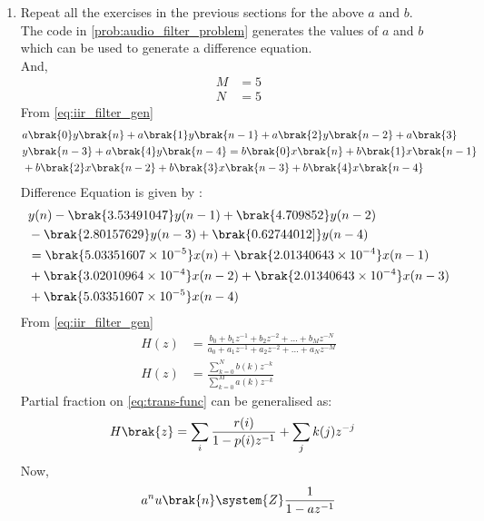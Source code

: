 \documentclass[journal,12pt,twocolumn]{IEEEtran}
\theoremstyle{remark}
\begin{document}
\begin{enumerate}[label=\thesection.\arabic*]
			\item Repeat all the exercises in the previous sections for the above $a$ and $b$.\\
				\solution The code in \ref{prob:audio_filter_problem} generates the values of $a$ and $b$  which can be used to generate a difference equation.\\
				And,
				\begin{align}
					    M &= 5\\
					        N&=5
				\end{align}
				From \ref{eq:iir_filter_gen} 
				\begin{align}
					    &a\brak{0}y\brak{n} + a\brak{1}y\brak{n-1}+a\brak{2}y\brak{n-2}+a\brak{3}\\ \notag &y\brak{n-3} + a\brak{4}y\brak{n-4} =   b\brak{0}x\brak{n} + b\brak{1}x\brak{n-1}\\ \notag &+b\brak{2}x\brak{n-2}+b\brak{3}x\brak{n-3} + b\brak{4}x\brak{n-4} 
				\end{align}
				Difference Equation is given by :
				\begin{align}
						&y(n) - \brak{3.53491047}y(n - 1) + \brak{4.709852}y(n - 2) \nonumber \\
							&- \brak{2.80157629}y(n - 3) + \brak{0.62744012]}y(n - 4) \nonumber \\
								&= \brak{5.03351607\times 10^{-5}}x(n) + \brak{2.01340643 \times 10^{-4}}x(n - 1) \nonumber \\
									&+ \brak{3.02010964 \times 10^{-4}}x(n - 2) + \brak{2.01340643 \times 10^{-4}}x(n - 3) \nonumber \\
										&+ \brak{5.03351607 \times 10^{-5}}x(n - 4)
				\end{align}
				From \eqref{eq:iir_filter_gen} 
				\begin{align}
					    H(z) &= \frac{b_0 + b_1 z^{-1} + b_2 z^{-2} + \ldots + b_M z^{-N}}{a_0 + a_1 z^{-1} + a_2 z^{-2} + \ldots + a_N z^{-M}}\\
					        H(z) &= \frac{\sum_{k = 0}^{N}b(k)z^{-k}}{\sum_{k = 0}^{M}a(k)z^{-k}} \label{eq:trans-func}
				\end{align}
				Partial fraction on \eqref{eq:trans-func} can be generalised as:
				\begin{align}
					    H\brak{z}&= \sum_{i}\frac{r(i)}{1 - p(i)z^{-1}} + \sum_{j}k(j)z^{-j}
					    	\label{eq:trans-func-pfe}
				\end{align}
				Now,
				\begin{align}
					    a^{n}u\brak{n} \system{Z} \frac{1}{1-az^{-1}} \label{eq:res-1}\\

\end{align}
\end{enumerate}
\end{document}
